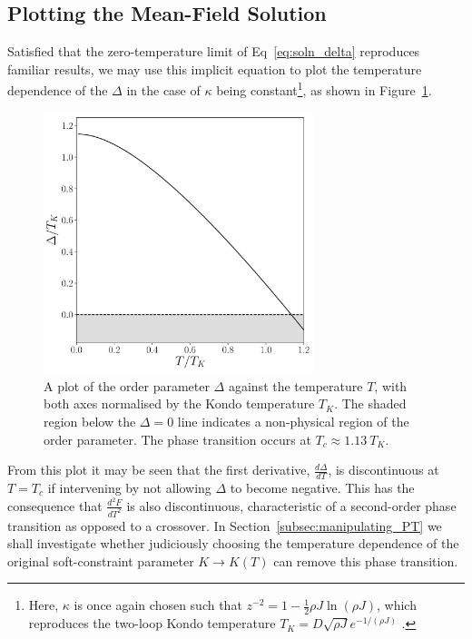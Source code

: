 
\subsection{Plotting the Mean-Field Solution}

Satisfied that the zero-temperature limit of Eq~\eqref{eq:soln_delta} reproduces familiar results, we may use this implicit equation to plot the temperature dependence of the $ \Delta $ in the case of $ \kappa $ being constant\footnote{Here, $ \kappa $ is once again chosen such that $ z^{-2} = 1 - \frac{1}{2} \rho J \ln{(\rho J)} $, which reproduces the two-loop Kondo temperature $ T_K = D \sqrt{\rho J} e^{-1 / (\rho J)} $ \cite{Draft}.}, as shown in Figure~\ref{fig:delta_vs_T}.

\begin{figure}
\centering
\includegraphics[width=0.7\textwidth]{Figures/delta_vs_T.pdf}
\caption{A plot of the order parameter $ \Delta $ against the temperature $ T $, with both axes normalised by the Kondo temperature $ T_K $. The shaded region below the $ \Delta = 0 $ line indicates a non-physical region of the order parameter. The phase transition occurs at $ T_c \approx 1.13 ~ T_K $.}
\label{fig:delta_vs_T}
\end{figure}

From this plot it may be seen that the first derivative, $ \frac{d \Delta}{d T} $, is discontinuous at $ T = T_c $ if intervening by not allowing $ \Delta $ to become negative. This has the consequence that $ \frac{d^2 F}{d T^2} $ is also discontinuous, characteristic of a second-order phase transition as opposed to a crossover. In Section~\ref{subsec:manipulating_PT} we shall investigate whether judiciously choosing the temperature dependence of the original soft-constraint parameter $ K \rightarrow K(T) $ can remove this phase transition.

